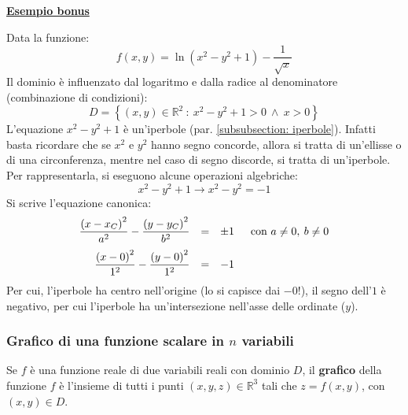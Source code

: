 \documentclass[a4paper]{article}
\newcommand{\definition}[1]{\textcolor{Red3}{\textbf{#1}}}
\newcommand{\example}[1]{\textcolor{Green4}{\textbf{#1}}}
\begin{document}
	\begin{flushleft}\label{esempio bonus rappresentare un dominio}
		\example{\underline{Esempio bonus}}
	\end{flushleft}
	Data la funzione:
	\begin{equation*}
		f\left(x,y\right) = \ln\left(x^{2}-y^{2}+1\right) - \dfrac{1}{\sqrt{x}}
	\end{equation*}
	Il dominio è influenzato dal logaritmo e dalla radice al denominatore (combinazione di condizioni):
	\begin{equation*}
		D = \left\{\left(x,y\right) \in \mathbb{R}^{2} \: : \: x^{2} - y^{2} + 1 > 0 \: \land \: x > 0\right\}
	\end{equation*}
	L'equazione $x^{2} - y^{2} + 1$ è un'iperbole (par. \ref{subsubsection: iperbole}). Infatti basta ricordare che se $x^{2}$ e $y^{2}$ hanno segno concorde, allora si tratta di un'ellisse o di una circonferenza, mentre nel caso di segno discorde, si tratta di un'iperbole. Per rappresentarla, si eseguono alcune operazioni algebriche:
	\begin{equation*}
		x^{2} - y^{2} + 1 \rightarrow x^{2} - y^{2} = - 1
	\end{equation*}
	Si scrive l'equazione canonica:
	\begin{equation*}
		\begin{array}{rcl}
			\dfrac{\left(x-x_{C}\right)^{2}}{a^{2}} - \dfrac{\left(y-y_{C}\right)^{2}}{b^{2}} &=& \pm 1 \hspace{1.5em} \text{con } a \ne 0, \: b \ne 0 \\ [1em]
			\dfrac{\left(x-0\right)^{2}}{1^{2}} - \dfrac{\left(y-0\right)^{2}}{1^{2}} &=& -1
		\end{array}
	\end{equation*}
	Per cui, l'iperbole ha centro nell'origine (lo si capisce dai $-0$!), il segno dell'$1$ è negativo, per cui l'iperbole ha un'intersezione nell'asse delle ordinate ($y$).

	\newpage

	\subsubsection{Grafico di una funzione scalare in \texorpdfstring{$n$}{n} variabili}\label{subsubsection: grafico di una funzione scalare in n variabili}

	\begin{boxdef}
		Se $f$ è una funzione reale di due variabili reali con dominio $D$, il \definition{grafico} della funzione $f$ è l'insieme di tutti i punti $\left(x,y,z\right) \in \mathbb{R}^{3}$ tali che $z = f\left(x,y\right)$, con $\left(x,y\right) \in D$.
	\end{boxdef}
	
\end{document}

